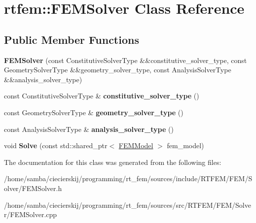 \hypertarget{classrtfem_1_1FEMSolver}{}\section{rtfem\+:\+:F\+E\+M\+Solver Class Reference}
\label{classrtfem_1_1FEMSolver}
\subsection*{Public Member Functions}
\begin{DoxyCompactItemize}
\item 
\mbox{\label{classrtfem_1_1FEMSolver_ad1d4aa21a4a8e86b5e0dbc8f9f76b583}} 
{\bfseries F\+E\+M\+Solver} (const Constitutive\+Solver\+Type \&\&constitutive\+\_\+solver\+\_\+type, const Geometry\+Solver\+Type \&\&geometry\+\_\+solver\+\_\+type, const Analysis\+Solver\+Type \&\&analysis\+\_\+solver\+\_\+type)
\item 
\mbox{\label{classrtfem_1_1FEMSolver_afa39adf6bf64fba7cff1d0ccac754ed3}} 
const Constitutive\+Solver\+Type \& {\bfseries constitutive\+\_\+solver\+\_\+type} ()
\item 
\mbox{\label{classrtfem_1_1FEMSolver_a52048bd67869bb0e65d378f4b88cd226}} 
const Geometry\+Solver\+Type \& {\bfseries geometry\+\_\+solver\+\_\+type} ()
\item 
\mbox{\label{classrtfem_1_1FEMSolver_a15ddb99888344eab615524eb55ec88a6}} 
const Analysis\+Solver\+Type \& {\bfseries analysis\+\_\+solver\+\_\+type} ()
\item 
\mbox{\label{classrtfem_1_1FEMSolver_a02fc9d1a5925b971aac2e24935800c64}} 
void {\bfseries Solve} (const std\+::shared\+\_\+ptr$<$ \hyperlink{classrtfem_1_1FEMModel}{F\+E\+M\+Model} $>$ fem\+\_\+model)
\end{DoxyCompactItemize}


The documentation for this class was generated from the following files\+:\begin{DoxyCompactItemize}
\item 
/home/samba/ciecierskij/programming/rt\+\_\+fem/sources/include/\+R\+T\+F\+E\+M/\+F\+E\+M/\+Solver/F\+E\+M\+Solver.\+h\item 
/home/samba/ciecierskij/programming/rt\+\_\+fem/sources/src/\+R\+T\+F\+E\+M/\+F\+E\+M/\+Solver/F\+E\+M\+Solver.\+cpp\end{DoxyCompactItemize}
